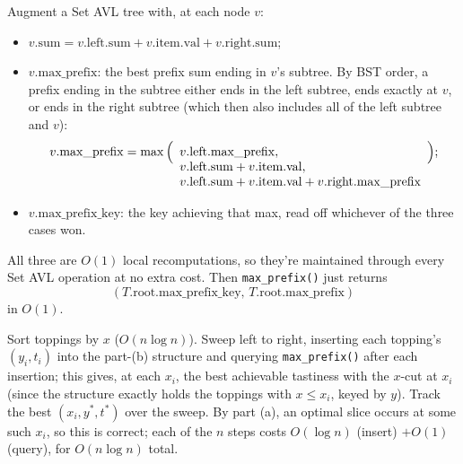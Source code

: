 \documentclass[12pt,twoside]{article}
\begin{document}
\begin{problems}
\begin{problemparts}
\problempart %
Augment a Set AVL tree with, at each node $v$:
\begin{itemize}
\item $v.\mathrm{sum} = v.\mathrm{left}.\mathrm{sum} +
    v.\mathrm{item}.\mathrm{val} + v.\mathrm{right}.\mathrm{sum}$;
\item $v.\mathrm{max\_prefix}$: the best prefix sum ending in $v$'s
    subtree. By BST order, a prefix ending in the subtree either ends
    in the left subtree, ends exactly at $v$, or ends in the right
    subtree (which then also includes all of the left subtree and
    $v$):
    \[
    v.\mathrm{max\_prefix} = \max\Big(
        \begin{array}[t]{l}
            v.\mathrm{left}.\mathrm{max\_prefix},\\
            v.\mathrm{left}.\mathrm{sum}+v.\mathrm{item}.\mathrm{val},\\
            v.\mathrm{left}.\mathrm{sum}+v.\mathrm{item}.\mathrm{val}+v.\mathrm{right}.\mathrm{max\_prefix}
        \end{array}
    \Big);
    \]
\item $v.\mathrm{max\_prefix\_key}$: the key achieving that max, read
    off whichever of the three cases won.
\end{itemize}
All three are $O(1)$ local recomputations, so they're maintained
through every Set AVL operation at no extra cost. Then
\texttt{max\_prefix()} just returns
$$(T.\mathrm{root}.\mathrm{max\_prefix\_key},\,T.\mathrm{root}.\mathrm{max\_prefix})$$
in $O(1)$.

\problempart %
Sort toppings by $x$ ($O(n\log n)$). Sweep left to right, inserting
each topping's $(y_i,t_i)$ into the part-(b) structure and querying
\texttt{max\_prefix()} after each insertion; this gives, at each
$x_i$, the best achievable tastiness with the $x$-cut at $x_i$ (since
the structure exactly holds the toppings with $x \le x_i$, keyed by
$y$). Track the best $(x_i,y^*,t^*)$ over the sweep. By part (a), an
optimal slice occurs at some such $x_i$, so this is correct; each of
the $n$ steps costs $O(\log n)$ (insert) $+ O(1)$ (query), for
$O(n\log n)$ total.

\end{problemparts}

\end{problems}
\end{document}
